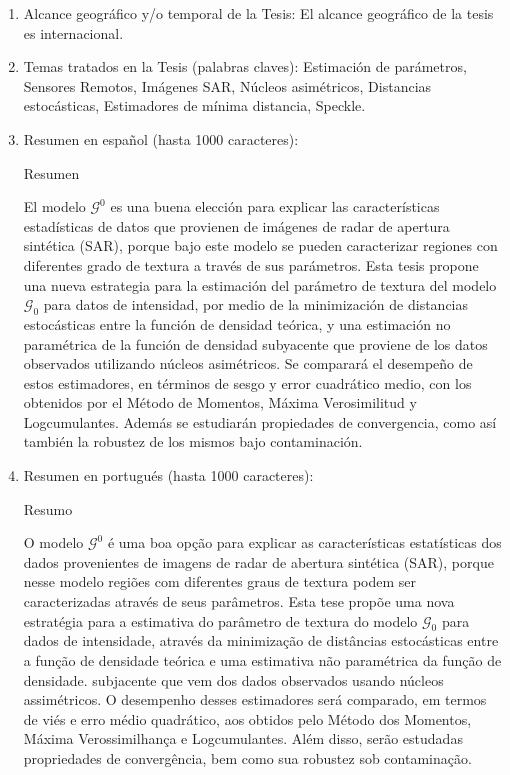 \begin{enumerate}
	\item Alcance geográfico y/o temporal de la Tesis: El alcance geográfico de la tesis es internacional.

	\item Temas tratados en la Tesis (palabras claves): Estimación de parámetros, Sensores Remotos, Imágenes SAR, Núcleos asimétricos, Distancias estocásticas, Estimadores de mínima distancia, Speckle.

	\item Resumen en español (hasta 1000 caracteres): 
	
	Resumen
	
	El modelo $\mathcal{G}^0$ es una buena elección para explicar las características estadísticas de datos que provienen de imágenes de radar de apertura sintética (SAR), porque bajo este modelo se pueden caracterizar regiones con diferentes grado de textura a través de sus parámetros.  Esta tesis propone una nueva estrategia para la estimación del parámetro de textura del modelo $\mathcal G_0$ para datos de intensidad, por medio de la minimización de distancias estocásticas entre la función de densidad teórica, y una estimación no paramétrica de la función de densidad subyacente que proviene de los datos observados utilizando núcleos asimétricos. Se comparará el desempeño de estos estimadores, en términos de sesgo y error cuadrático medio, con los obtenidos por el Método de Momentos, Máxima Verosimilitud y Logcumulantes. Además se estudiarán propiedades de convergencia, como así también la robustez de los mismos bajo contaminación. 


	\item Resumen en portugués (hasta 1000 caracteres):
	
	Resumo

	O modelo $ \mathcal {G}^0$ é uma boa opção para explicar as características estatísticas dos dados provenientes de imagens de radar de abertura sintética (SAR), porque nesse modelo regiões com diferentes graus de textura podem ser caracterizadas através de seus parâmetros. Esta tese propõe uma nova estratégia para a estimativa do parâmetro de textura do modelo $\mathcal{G}_0$ para dados de intensidade, através da minimização de distâncias estocásticas entre a função de densidade teórica e uma estimativa não paramétrica da função de densidade. subjacente que vem dos dados observados usando núcleos assimétricos. O desempenho desses estimadores será comparado, em termos de viés e erro médio quadrático, aos obtidos pelo Método dos Momentos, Máxima Verossimilhança e Logcumulantes. Além disso, serão estudadas propriedades de convergência, bem como sua robustez sob contaminação.
	

\end{enumerate}
